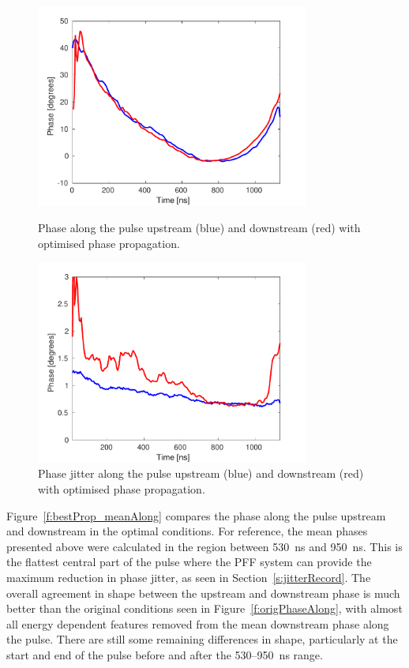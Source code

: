 \begin{figure}
  \centering
  \includegraphics[width=0.8\textwidth]{Figures/propagation/bestProp_meanAlong}
  \caption{Phase along the pulse upstream (blue) and downstream (red) with optimised phase propagation.}
  \label{f:bestProp_meanAlong}
  \includegraphics[width=0.8\textwidth]{Figures/propagation/bestProp_jitAlong}
  \caption{Phase jitter along the pulse upstream (blue) and downstream (red) with optimised phase propagation.}
  \label{f:bestProp_jitAlong}
\end{figure}

Figure~\ref{f:bestProp_meanAlong} compares the phase along the pulse upstream and downstream in the optimal conditions. For reference, the mean phases presented above were calculated in the region between 530~ns and 950~ns. This is the flattest central part of the pulse where the PFF system can provide the maximum reduction in phase jitter, as seen in Section~\ref{s:jitterRecord}. The overall agreement in shape between the upstream and downstream phase is much better than the original conditions seen in Figure~\ref{f:origPhaseAlong}, with almost all energy dependent features removed from the mean downstream phase along the pulse. There are still some remaining differences in shape, particularly at the start and end of the pulse before and after the 530--950~ns range.


